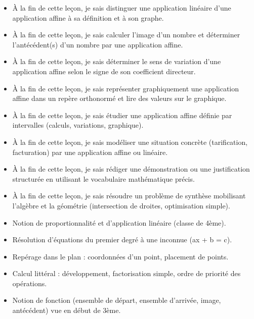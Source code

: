 \documentclass[11pt]{article}
\begin{document}
\begin{objectifs}
\begin{itemize}
\item À la fin de cette leçon, je sais distinguer une application linéaire d'une application affine à sa définition et à son graphe.
\item À la fin de cette leçon, je sais calculer l'image d'un nombre et déterminer l'antécédent(s) d'un nombre par une application affine.
\item À la fin de cette leçon, je sais déterminer le sens de variation d'une application affine selon le signe de son coefficient directeur.
\item À la fin de cette leçon, je sais représenter graphiquement une application affine dans un repère orthonormé et lire des valeurs sur le graphique.
\item À la fin de cette leçon, je sais étudier une application affine définie par intervalles (calculs, variations, graphique).
\item À la fin de cette leçon, je sais modéliser une situation concrète (tarification, facturation) par une application affine ou linéaire.
\item À la fin de cette leçon, je sais rédiger une démonstration ou une justification structurée en utilisant le vocabulaire mathématique précis.
\item À la fin de cette leçon, je sais résoudre un problème de synthèse mobilisant l'algèbre et la géométrie (intersection de droites, optimisation simple).
\end{itemize}
\end{objectifs}

\begin{prerequis}
\begin{itemize}
\item Notion de proportionnalité et d'application linéaire (classe de 4ème).
\item Résolution d'équations du premier degré à une inconnue (ax + b = c).
\item Repérage dans le plan : coordonnées d'un point, placement de points.
\item Calcul littéral : développement, factorisation simple, ordre de priorité des opérations.
\item Notion de fonction (ensemble de départ, ensemble d'arrivée, image, antécédent) vue en début de 3ème.
\end{itemize}
\end{prerequis}
\end{document}
